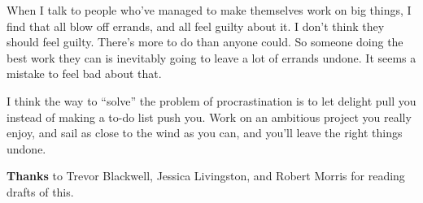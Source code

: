 When I talk to people who've managed to make themselves work on big
things, I find that all blow off errands, and all feel guilty about it.
I don't think they should feel guilty. There's more to do than anyone
could. So someone doing the best work they can is inevitably going to
leave a lot of errands undone. It seems a mistake to feel bad about
that.

I think the way to ``solve'' the problem of procrastination is to let
delight pull you instead of making a to-do list push you. Work on an
ambitious project you really enjoy, and sail as close to the wind as you
can, and you'll leave the right things undone.

\textbf{Thanks} to Trevor Blackwell, Jessica Livingston, and Robert
Morris for reading drafts of this.

